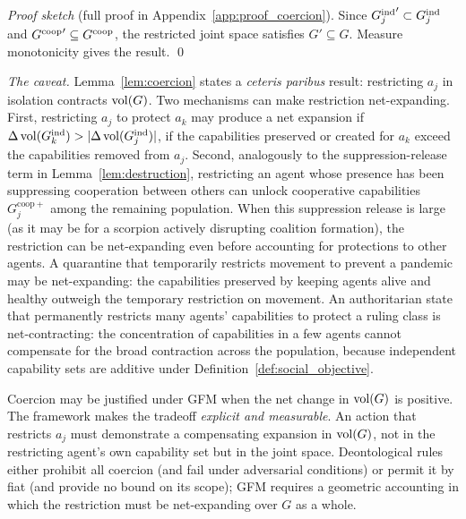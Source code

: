 \emph{Proof sketch} (full proof in Appendix~\ref{app:proof_coercion}).
Since ${G_{j}^{\mathrm{ind}}}' \subset G_{j}^{\mathrm{ind}}$ and ${G^{\mathrm{coop}}}'
\subseteq G^{\mathrm{coop}}$, the restricted joint space satisfies $G' \subseteq G$.
Measure monotonicity gives the result. \qed

\emph{The caveat.} Lemma~\ref{lem:coercion} states a \emph{ceteris paribus}
result: restricting $a_j$ in isolation contracts $\operatorname{vol}(G)$. Two mechanisms can
make restriction net-expanding. First, restricting $a_j$ to protect $a_k$ may
produce a net expansion if $\Delta \operatorname{vol}(G_{k}^{\mathrm{ind}}) > |\Delta
\operatorname{vol}(G_{j}^{\mathrm{ind}})|$, if the capabilities preserved or created for $a_k$ exceed
the capabilities removed from $a_j$. Second, analogously to the
suppression-release term in Lemma~\ref{lem:destruction}, restricting an agent
whose presence has been suppressing cooperation between others can unlock
cooperative capabilities $G^{\mathrm{coop}+}_{j}$ among the remaining
population. When this suppression release is large (as it may be for a scorpion
actively disrupting coalition formation), the restriction can be net-expanding
even before accounting for protections to other agents. A quarantine that
temporarily restricts movement to prevent a pandemic may be net-expanding: the
capabilities preserved by keeping agents alive and healthy outweigh the
temporary restriction on movement. An authoritarian state that permanently
restricts many agents' capabilities to protect a ruling class is
net-contracting: the concentration of capabilities in a few agents cannot
compensate for the broad contraction across the population, because independent
capability sets are additive under Definition~\ref{def:social_objective}.

Coercion may be justified under GFM when the net change in $\operatorname{vol}(G)$ is
positive. The framework makes the tradeoff \emph{explicit and measurable}. An
action that restricts $a_j$ must demonstrate a compensating expansion in
$\operatorname{vol}(G)$, not in the restricting agent's own capability set but in the joint
space. Deontological rules either prohibit all coercion (and fail under
adversarial conditions) or permit it by fiat (and provide no bound on its
scope); GFM requires a geometric accounting in which the restriction must be
net-expanding over $G$ as a whole.


